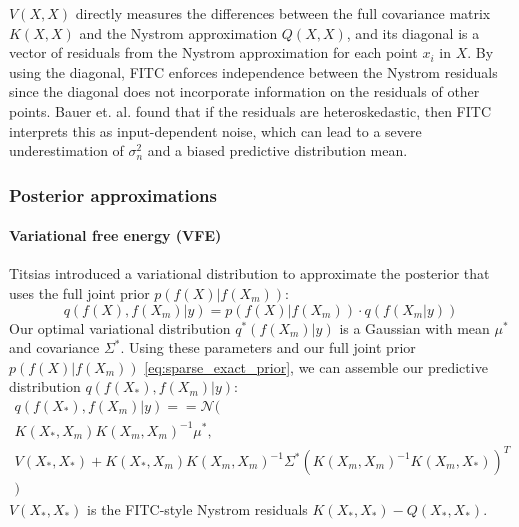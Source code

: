 $V(X, X)$ directly measures the differences between the full covariance matrix $K(X, X)$ and the Nystrom approximation $Q(X, X)$, and its diagonal is a vector of residuals from the Nystrom approximation for each point $x_i$ in $X$. By using the diagonal, FITC enforces independence between the Nystrom residuals since the diagonal does not incorporate information on the residuals of other points. Bauer et. al. \cite{fitc-heteroskedasticity} found that if the residuals are heteroskedastic, then FITC interprets this as input-dependent noise, which can lead to a severe underestimation of $\sigma_n^2$ and a biased predictive distribution mean.

\subsubsection{Posterior approximations}

\paragraph{Variational free energy (VFE)}
Titsias \cite{vfe} introduced a variational distribution to approximate the posterior that uses the full joint prior $p(f(X) | f(X_m))$:
\begin{equation} \label{eq:vfe_posterior}
    q(f(X), f(X_m) | y) = p(f(X) | f(X_m)) \cdot q(f(X_m | y))
\end{equation}
Our optimal variational distribution $q^*(f(X_m) | y)$ is a Gaussian with mean $\mu^*$ and covariance $\Sigma^*$. Using these parameters and our full joint prior $p(f(X) | f(X_m))$ \ref{eq:sparse_exact_prior}, we can assemble our predictive distribution $q(f(X_*), f(X_m) | y)$: 
\begin{equation*}
    \begin{aligned}
        q(f(X_*), f(X_m) | y) = 
        = \mathcal{N}( \\
            K(X_*, X_m) K(X_m, X_m)^{-1} \mu^*, \\
            V(X_*, X_*) + K(X_*, X_m) K(X_m, X_m)^{-1} \Sigma^* \left( K(X_m, X_m)^{-1} K(X_m, X_*) \right)^T \\
        )
    \end{aligned}
\end{equation*}
$V(X_*, X_*)$ is the FITC-style Nystrom residuals $K(X_*, X_*) - Q(X_*, X_*)$.

